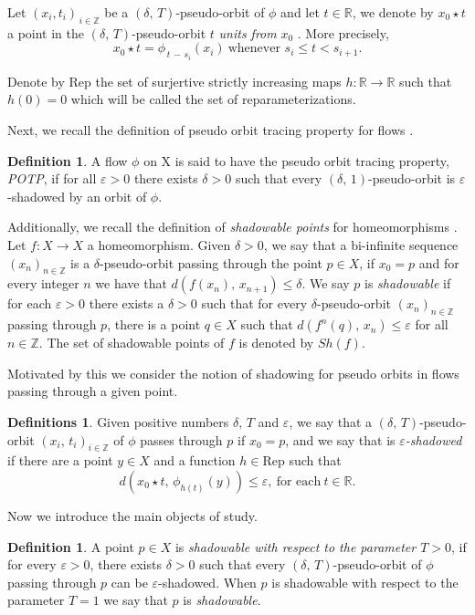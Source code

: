 \documentclass{amsart}
\theoremstyle{definition}
\newtheorem{definition}[theorem]{Definition}
\newtheorem{definitions}[theorem]{Definitions}
\newcommand{\ep}{\varepsilon}
\begin{document}
    
Let $(x_i, t_i)_{\,i\in \mathbb{Z}}$ be a $(\delta,\, T)$-pseudo-orbit of $\phi$ and let $t\in \mathbb{R}$, we denote by $x_0\star t$ a point in the $(\delta,\, T)$-pseudo-orbit $t$ {\em units from} $x_0$ \cite{Komuro84}. More precisely,
\[x_0\star t = \phi_{\,t\,-\,s_i}(x_i)\ \mbox{whenever } s_i\leq t < s_{i+1}.\]

Denote by $\mathrm{Rep}$ the set of surjertive strictly increasing maps $ h:\mathbb{R}\rightarrow \mathbb{R}$ such that $h(0)=0$ which will be called the set of reparameterizations.

Next, we recall the definition of pseudo orbit tracing property for flows \cite{Thomas84}.

\begin{definition}\label{defi01}
A flow $\phi$ on X is said to have the pseudo orbit tracing property, {\em POTP}, if for all $\ep>0$ there exists $\delta>0$ such that every  $(\delta,\,1)$-pseudo-orbit is $\ep$-shadowed by an orbit of $\phi$.
\end{definition}


Additionally, we recall the definition of {\em shadowable points} for homeomorphisms \cite{Morales16}. Let $f\colon X\to X$ a homeomorphism. Given $\delta>0$, we say that a bi-infinite
sequence $(x_n)_{n\in\mathbb{Z}}$ is a $\delta$-pseudo-orbit passing through the point $p\in X$, if $x_0=p$ and for every integer $n$ we have that $d(f(x_n),\,x_{n+1})\leq\delta$. We say $p$ is \emph{shadowable} if for each $\ep>0$ there exists a $\delta>0$  such that for every $\delta$-pseudo-orbit $(x_n)_{n\in\mathbb{Z}}$ passing through $p$, there is a point $q\in X$ such that $d(f^n(q),\,x_n)\leq\ep$ for all $n\in\mathbb{Z}$. The set of shadowable points of $f$ is denoted by $Sh(f)$.

Motivated by this we consider the notion of shadowing for pseudo orbits in flows passing through a given point.

\begin{definitions}\label{defi1}
Given positive numbers $\delta,\, T$ and $\ep$, we say that a $(\delta,\, T)$-pseudo-orbit $(x_i,\, t_i)_{i\in \mathbb{Z}}$ of $\phi$ passes through $p$ if $x_0=p$, and we say that is {\em $\ep$-shadowed}  if there are a point $y\in X$ and a function $h\in \mathrm{Rep}$ such that
$$d(x_0\star t,\, \phi_{h(t)}(y)) \leq \ep, \ \mbox{for each}\ t\in \mathbb{R}.$$
\end{definitions}
  

Now we introduce the main objects of study.


\begin{definition}\label{defi3}
A point $p\in X$ is \emph{shadowable with respect to the parameter $T>0$}, if for every $\ep > 0$, there exists $\delta > 0$ such that every $(\delta,\, T)$-pseudo-orbit of $\phi$ passing through $p$ can be $\ep$-shadowed. When $p$ is shadowable with respect to the parameter $T=1$ we say that $p$ is \emph{shadowable}.
\end{definition}
  
\end{document}

